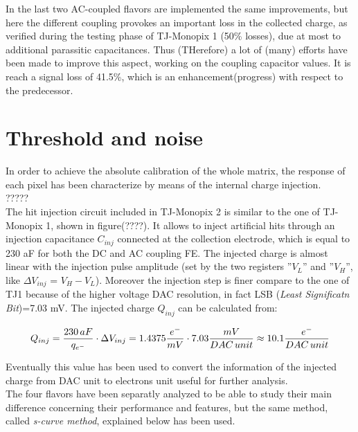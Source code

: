 In the last two AC-coupled flavors are implemented the same improvements, but here the different coupling provokes an important loss in the collected charge, as verified during the testing phase of TJ-Monopix 1 (50\% losses), due at most to additional parassitic capacitances. Thus (THerefore) a lot of (many) efforts have been made to improve this aspect, working on the coupling capacitor values. It is reach a signal loss of 41.5\%, which is an enhancement(progress) with respect to the predecessor.





\section{Threshold and noise}

In order to achieve the absolute calibration of the whole matrix, the response of each pixel has been characterize by means of the internal charge injection. \\
?????\\
The hit injection circuit included in TJ-Monopix 2 is similar to the one of TJ-Monopix 1, shown in figure(????). It allows to inject artificial hits through an injection capacitance \textbf{$C_{inj}$} connected at the collection electrode, which is equal to 230 aF for both the DC and AC coupling FE. The injected charge is almost linear with the injection pulse amplitude (set by the two registers ''\textbf{$V_{L}$}'' and ''\textbf{$V_{H}$}'', like $\Delta V_{inj}$ = \textbf{$V_{H}-V_{L}$}). Moreover the injection step is finer compare to the one of TJ1 because of the higher voltage DAC resolution, in fact LSB (\textit{Least Significatn Bit})=7.03 mV. The injected charge $Q_{inj}$ can be calculated from:

\begin{equation}
\small
Q_{inj} = \frac{230 \, aF}{q_{{e}^{-}}} \cdot \Delta V_{inj} = 1.4375 \frac{e^{-}}{mV} \cdot 7.03 \frac{mV}{DAC \, unit} \approx 10.1 \frac{e^{-}}{DAC \, unit}  
\end{equation}

Eventually this value has been used to convert the information of the injected charge from DAC unit to electrons unit useful for further analysis.
\\
The four flavors have been separatly analyzed to be able to study their main difference concerning their performance and features, but the same method, called \textit{s-curve method}, explained below has been used. 


